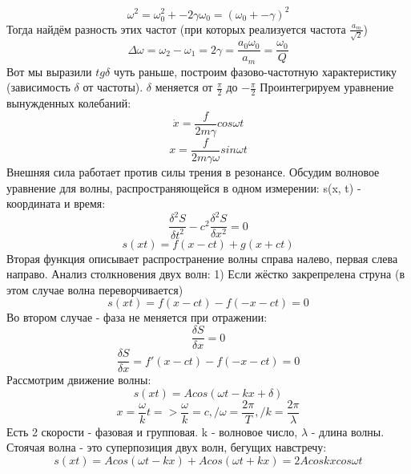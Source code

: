 \[\omega^2 = \omega_0^2 +- 2\gamma\omega_0 = (\omega_0 +- \gamma)^2\]
Тогда найдём разность этих частот (при которых реализуется частота $\frac{a_m}{\sqrt{2}}$)
\[\Delta\omega = \omega_2 - \omega_1 = 2\gamma = \frac{a_0\omega_0}{a_m} = \frac{\omega_0}{Q}\]
Вот мы выразили $tg \delta$ чуть раньше, построим фазово-частотную характеристику (зависимость $\delta$ от частоты).
$\delta$ меняется от $\frac{\pi}{2}$ до $-\frac{\pi}{2}$
Проинтегрируем уравнение вынужденных колебаний:
\[\dot x = \frac{f}{2m\gamma}cos\omega t\]
\[x = \frac{f}{2m\gamma\omega} sin \omega t\]
Внешняя сила работает против силы трения в резонансе.
Обсудим волновое уравнение для волны, распространяющейся в одном измерении:
s(x, t) - координата и время:
\[\frac{\delta^2S}{\delta t^2} - c^2\frac{\delta^2S}{\delta x^2} = 0\]
\[s(xt) = f(x - ct) + g(x + ct)\]
Вторая функция описывает распространение волны справа налево, первая слева направо.
Анализ столкновения двух волн:
1) Если жёстко закрепрелена струна (в этом случае волна переворчивается)
\[s(xt) = f(x - ct) - f(-x-ct) = 0\]
Во втором случае - фаза не меняется при отражении:
\[\frac{\delta S}{\delta x} = 0\]
\[\frac{\delta S}{\delta x} = f'(x - ct) - f(-x-ct) = 0\]
Рассмотрим движение волны:
\[s(xt) = Acos(\omega t - kx + \delta)\]
\[x = \frac{\omega}{k}t => \frac{\omega}{k} = c, / \omega = \frac{2\pi}{T}, / k = \frac{2\pi}{\lambda}\]
Есть 2 скорости - фазовая и групповая.
k - волновое число, $\lambda$ - длина волны.
Стоячая волна - это суперпозиция двух волн, бегущих навстречу:
\[s(xt) = Acos(\omega t - kx) + Acos(\omega t + kx) = 2Acoskxcos\omega t\]